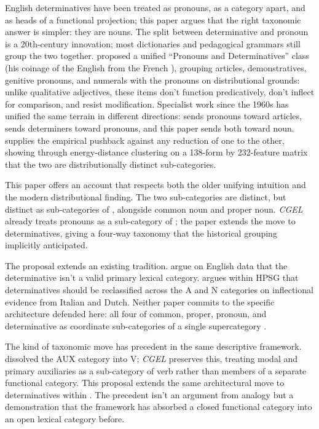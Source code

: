 \documentclass[12pt]{article}
\begin{document}
English determinatives have been treated as pronouns, as a category apart, and as heads of a functional projection; this paper argues that the right taxonomic answer is simpler: they are nouns. The split between determinative and pronoun is a 20th-century innovation; most dictionaries and pedagogical grammars still group the two together. \textcite{palmer1924} proposed a unified \enquote{Pronouns and Determinatives} class (his coinage of the English  from the French ), grouping articles, demonstratives, genitive pronouns, and numerals with the pronouns on distributional grounds: unlike qualitative adjectives, these items don't function predicatively, don't inflect for comparison, and resist modification. Specialist work since the 1960s has unified the same terrain in different directions: \citet{postal1966} sends pronouns toward articles, \citet{hudson2004determiners} sends determiners toward pronouns, and this paper sends both toward noun. \citet{reynolds2021} supplies the empirical pushback against any reduction of one to the other, showing through energy-distance clustering on a 138-form by 232-feature matrix that the two are distributionally distinct sub-categories.

This paper offers an account that respects both the older unifying intuition and the modern distributional finding. The two sub-categories are distinct, but distinct as sub-categories of , alongside common noun and proper noun. \textit{CGEL} \citep{huddleston2002} already treats pronouns as a sub-category of ; the paper extends the move to determinatives, giving a four-way taxonomy that the historical grouping implicitly anticipated.

The proposal extends an existing tradition. \textcite{spinillo2000determiners,spinillo2004reconceptualising} argue on English data that the determinative isn't a valid primary lexical category. \textcite{vaneynde2003determiner} argues within HPSG that determinatives should be reclassified across the A and N categories on inflectional evidence from Italian and Dutch. Neither paper commits to the specific architecture defended here: all four of common, proper, pronoun, and determinative as coordinate sub-categories of a single supercategory .

The kind of taxonomic move has precedent in the same descriptive framework. \textcite{pullumwilson1977} dissolved the AUX category into V; \textit{CGEL} preserves this, treating modal and primary auxiliaries as a sub-category of verb rather than members of a separate functional category. This proposal extends the same architectural move to determinatives within . The precedent isn't an argument from analogy but a demonstration that the framework has absorbed a closed functional category into an open lexical category before.
\end{document}
